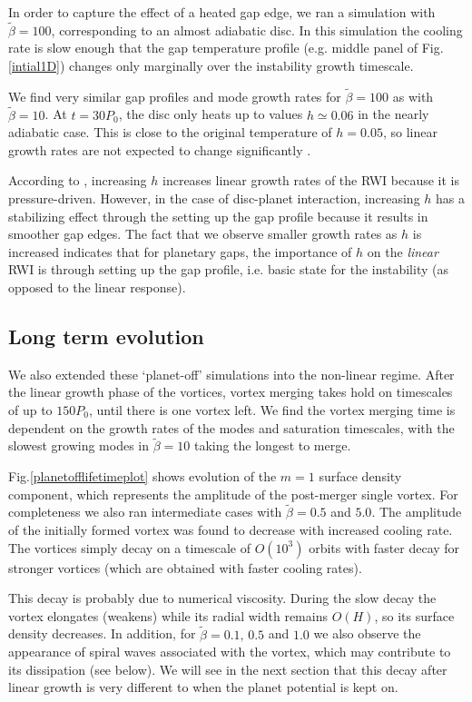 In order to capture the effect of a heated gap edge, we ran a simulation with 
$\tilde{\beta}=100$, corresponding to an almost adiabatic disc.  
In this simulation the cooling rate is slow enough that the gap 
temperature profile (e.g. middle panel of Fig. \ref{intial1D}) changes
only marginally over the instability growth timescale. 

We find very similar gap profiles and mode growth rates for
$\tilde{\beta}=100$ as with $\tilde{\beta}=10$. At $t=30P_0$, the disc only heats up to
values $h\simeq0.06$ in the nearly adiabatic case. This is close to
the original temperature of $h=0.05$, so linear growth rates are not expected
to change significantly \citep{li00}. 

According to \cite{li00}, increasing $h$ increases linear growth rates
of the RWI because it is pressure-driven. However, in the case 
of disc-planet interaction, increasing $h$ has a stabilizing effect
through the setting up the gap profile because it results in smoother gap
edges. The fact that we observe smaller growth rates as $h$ is
increased indicates that for planetary gaps, the importance of $h$ on
the \emph{linear} RWI is through setting up the gap profile, i.e. basic
state for the instability (as opposed to the linear response). 

\subsection{Long term evolution} \label{nonlinearplanetoff} 


We also extended these `planet-off' simulations into the non-linear
regime. After the linear growth phase of the vortices, vortex merging
takes hold on timescales of up to $150P_0$, until there is one vortex
left. We find the vortex merging
time is dependent on the growth rates of the modes and saturation
timescales, with the slowest growing modes in $\tilde\beta=10$ taking
the longest to merge.  

Fig.\ref{planetofflifetimeplot} shows evolution of the $m=1$ surface
density component, which represents the amplitude of the post-merger
single vortex. For completeness we also ran intermediate cases with
$\tilde{\beta}=0.5$ and $5.0$. The amplitude of the initially formed vortex was 
found to decrease with increased cooling rate. The vortices simply decay on a
timescale of $O(10^3)$ orbits with faster decay for stronger vortices
(which are obtained with faster cooling rates). 

This decay is probably due to numerical viscosity. During the
  slow decay the vortex elongates (weakens) while its radial width
  remains $O(H)$, so its surface density decreases. In addition, for 
  $\tilde{\beta}=0.1,\,0.5$ and $1.0$ we also observe the appearance of
  spiral waves associated with the vortex, which may contribute to
  its dissipation (see below). 
We will see in the
next section that this decay after linear growth is very
different to when the planet potential is kept on. 



